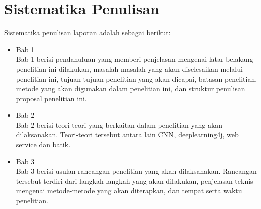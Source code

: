 \section{Sistematika Penulisan}
Sistematika penulisan laporan adalah sebagai berikut:
\begin{itemize}
	\item Bab 1 \babSatu \\
	Bab 1 berisi pendahuluan yang memberi penjelasan mengenai latar belakang penelitian ini dilakukan, masalah-masalah yang akan diselesaikan melalui penelitian ini, tujuan-tujuan penelitian yang akan dicapai, batasan penelitian, metode yang akan digunakan dalam penelitian ini, dan struktur penulisan proposal penelitian ini.
	\item Bab 2 \babDua \\
	Bab 2 berisi teori-teori yang berkaitan dalam penelitian yang akan dilaksanakan. Teori-teori tersebut antara lain CNN, deeplearning4j, web service dan batik.
	\item Bab 3 \babTiga \\
	Bab 3 berisi usulan rancangan penelitian yang akan dilaksanakan. Rancangan tersebut terdiri dari langkah-langkah yang akan dilakukan, penjelasan teknis mengenai metode-metode yang akan diterapkan, dan tempat serta waktu penelitian.
\end{itemize}


